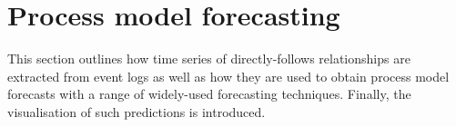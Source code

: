 \section{Process model forecasting}\label{sec:methodology}
This section outlines how time series of directly-follows relationships are extracted from event logs as well as how they are used to obtain process model forecasts with a range of widely-used forecasting techniques.
Finally, the visualisation of such predictions is introduced.





